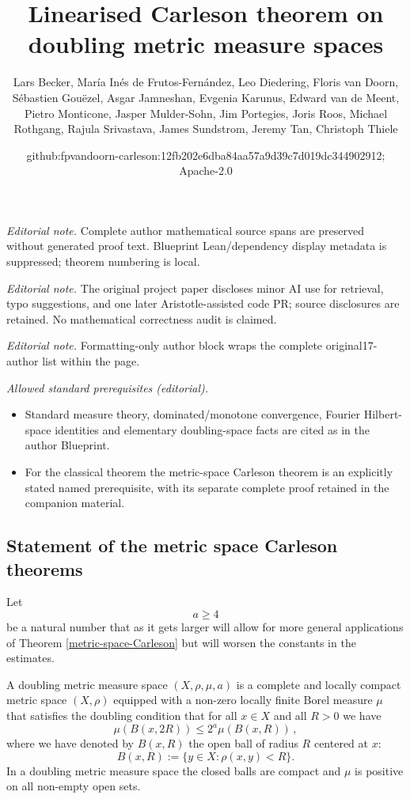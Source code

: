 \documentclass[10pt,a4paper]{article}
\title{Linearised Carleson theorem on doubling metric measure spaces}
\author{Lars Becker, María Inés de Frutos-Fernández, Leo Diedering, Floris van Doorn, Sébastien Gouëzel, Asgar Jamneshan, Evgenia Karunus, Edward van de Meent, Pietro Monticone, Jasper Mulder-Sohn, Jim Portegies, Joris Roos, Michael Rothgang, Rajula Srivastava, James Sundstrom, Jeremy Tan, Christoph Thiele}
\date{github:fpvandoorn-carleson:12fb202e6dba84aa57a9d39c7d019dc344902912; Apache-2.0}
\theoremstyle{plain}
\theoremstyle{definition}
\numberwithin{equation}{subsection}
\begin{document}
\maketitle
\noindent\textit{Editorial note.} Complete author mathematical source spans are preserved without generated proof text. Blueprint Lean/dependency display metadata is suppressed; theorem numbering is local.\par\medskip
\noindent\textit{Editorial note.} The original project paper discloses minor AI use for retrieval, typo suggestions, and one later Aristotle-assisted code PR; source disclosures are retained. No mathematical correctness audit is claimed.\par\medskip
\noindent\textit{Editorial note.} Formatting-only author block wraps the complete original17-author list within the page.\par\medskip
\noindent\textit{Allowed standard prerequisites (editorial).}\begin{itemize}
\item Standard measure theory, dominated/monotone convergence, Fourier Hilbert-space identities and elementary doubling-space facts are cited as in the author Blueprint.
\item For the classical theorem the metric-space Carleson theorem is an explicitly stated named prerequisite, with its separate complete proof retained in the companion material.
\end{itemize}\medskip
\subsection{Statement of the metric space Carleson theorems}

Let
\begin{equation}
    a\ge 4
\end{equation}
be a natural number that as it gets larger will allow for more general applications of Theorem \ref{metric-space-Carleson}
but will worsen the constants in the estimates.


A doubling metric measure space $(X,\rho,\mu, a)$ is a complete
and locally compact metric space $(X,\rho)$
equipped with a non-zero locally finite Borel measure $\mu$ that satisfies the doubling condition that for all $x\in X$ and all $R>0$ we have
\begin{equation}\label{doublingx}
    \mu(B(x,2R))\le 2^a\mu(B(x,R))\,,
\end{equation}
where we have denoted by $B(x,R)$ the open ball of radius $R$ centered at $x$:
\begin{equation}\label{eq-define-ball}
 B(x,R):=\{y\in X: \rho(x,y)<R\}. \end{equation}
In a doubling metric measure space the closed balls are compact and $\mu$ is positive on all non-empty open sets.
\end{document}
